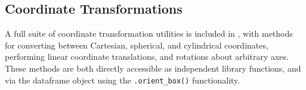 \subsection{Coordinate Transformations}
\label{sec:coords}
A full suite of coordinate transformation utilities is included in , with methods for converting between Cartesian, spherical, and cylindrical coordinates, performing linear coordinate translations, and rotations about arbitrary axes.  
These methods are both directly accessible as independent library functions, and via the  dataframe object using the \verb|.orient_box()| functionality.